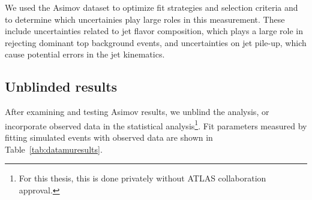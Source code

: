 We used the Asimov dataset to optimize fit strategies and selection criteria and to determine which uncertainies play large roles in this measurement. These include uncertainties related to jet flavor composition, which plays a large role in rejecting dominant top background events, and uncertainties on jet pile-up, which cause potential errors in the jet kinematics.

\subsection{Unblinded results}

After examining and testing Asimov results, we unblind the analysis, or incorporate observed data in the statistical analysis\footnote{For this thesis, this is done privately without ATLAS collaboration approval.}. Fit parameters measured by fitting simulated events with observed data are shown in Table~\ref{tab:datamuresults}. 

